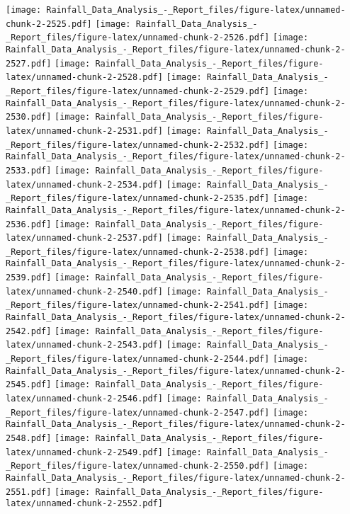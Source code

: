\documentclass[
]{article}
\begin{document}
\texttt{[image: Rainfall\_Data\_Analysis\_-\_Report\_files/figure-latex/unnamed-chunk-2-2525.pdf]}
\texttt{[image: Rainfall\_Data\_Analysis\_-\_Report\_files/figure-latex/unnamed-chunk-2-2526.pdf]}
\texttt{[image: Rainfall\_Data\_Analysis\_-\_Report\_files/figure-latex/unnamed-chunk-2-2527.pdf]}
\texttt{[image: Rainfall\_Data\_Analysis\_-\_Report\_files/figure-latex/unnamed-chunk-2-2528.pdf]}
\texttt{[image: Rainfall\_Data\_Analysis\_-\_Report\_files/figure-latex/unnamed-chunk-2-2529.pdf]}
\texttt{[image: Rainfall\_Data\_Analysis\_-\_Report\_files/figure-latex/unnamed-chunk-2-2530.pdf]}
\texttt{[image: Rainfall\_Data\_Analysis\_-\_Report\_files/figure-latex/unnamed-chunk-2-2531.pdf]}
\texttt{[image: Rainfall\_Data\_Analysis\_-\_Report\_files/figure-latex/unnamed-chunk-2-2532.pdf]}
\texttt{[image: Rainfall\_Data\_Analysis\_-\_Report\_files/figure-latex/unnamed-chunk-2-2533.pdf]}
\texttt{[image: Rainfall\_Data\_Analysis\_-\_Report\_files/figure-latex/unnamed-chunk-2-2534.pdf]}
\texttt{[image: Rainfall\_Data\_Analysis\_-\_Report\_files/figure-latex/unnamed-chunk-2-2535.pdf]}
\texttt{[image: Rainfall\_Data\_Analysis\_-\_Report\_files/figure-latex/unnamed-chunk-2-2536.pdf]}
\texttt{[image: Rainfall\_Data\_Analysis\_-\_Report\_files/figure-latex/unnamed-chunk-2-2537.pdf]}
\texttt{[image: Rainfall\_Data\_Analysis\_-\_Report\_files/figure-latex/unnamed-chunk-2-2538.pdf]}
\texttt{[image: Rainfall\_Data\_Analysis\_-\_Report\_files/figure-latex/unnamed-chunk-2-2539.pdf]}
\texttt{[image: Rainfall\_Data\_Analysis\_-\_Report\_files/figure-latex/unnamed-chunk-2-2540.pdf]}
\texttt{[image: Rainfall\_Data\_Analysis\_-\_Report\_files/figure-latex/unnamed-chunk-2-2541.pdf]}
\texttt{[image: Rainfall\_Data\_Analysis\_-\_Report\_files/figure-latex/unnamed-chunk-2-2542.pdf]}
\texttt{[image: Rainfall\_Data\_Analysis\_-\_Report\_files/figure-latex/unnamed-chunk-2-2543.pdf]}
\texttt{[image: Rainfall\_Data\_Analysis\_-\_Report\_files/figure-latex/unnamed-chunk-2-2544.pdf]}
\texttt{[image: Rainfall\_Data\_Analysis\_-\_Report\_files/figure-latex/unnamed-chunk-2-2545.pdf]}
\texttt{[image: Rainfall\_Data\_Analysis\_-\_Report\_files/figure-latex/unnamed-chunk-2-2546.pdf]}
\texttt{[image: Rainfall\_Data\_Analysis\_-\_Report\_files/figure-latex/unnamed-chunk-2-2547.pdf]}
\texttt{[image: Rainfall\_Data\_Analysis\_-\_Report\_files/figure-latex/unnamed-chunk-2-2548.pdf]}
\texttt{[image: Rainfall\_Data\_Analysis\_-\_Report\_files/figure-latex/unnamed-chunk-2-2549.pdf]}
\texttt{[image: Rainfall\_Data\_Analysis\_-\_Report\_files/figure-latex/unnamed-chunk-2-2550.pdf]}
\texttt{[image: Rainfall\_Data\_Analysis\_-\_Report\_files/figure-latex/unnamed-chunk-2-2551.pdf]}
\texttt{[image: Rainfall\_Data\_Analysis\_-\_Report\_files/figure-latex/unnamed-chunk-2-2552.pdf]}
\end{document}
